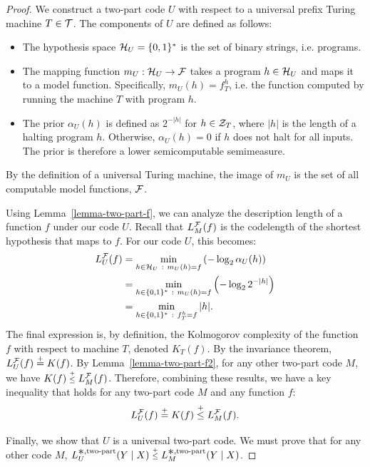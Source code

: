 \begin{proof}
We construct a two-part code $U$ with respect to a universal prefix Turing machine $T \in {\mathcal{T}}$. The components of $U$ are defined as follows:
\begin{itemize}
    \item The hypothesis space ${\mathcal{H}}_U = \{0,1\}^*$ is the set of binary strings, i.e. programs.
    \item The mapping function $m_U: {\mathcal{H}}_U \to {\mathcal{F}}$ takes a program $h \in {\mathcal{H}}_U$ and maps it to a model function. Specifically, $m_U(h) = f_T^h$, i.e. the function computed by running the machine $T$ with program $h$.
    \item The prior $\alpha_U(h)$ is defined as $2^{-|h|}$ for $h \in {\mathcal{Z}}_T$, where $|h|$ is the length of a halting program $h$. Otherwise, $\alpha_U(h) = 0$ if $h$ does not halt for all inputs. The prior is therefore a lower semicomputable semimeasure.
\end{itemize}

By the definition of a universal Turing machine, the image of $m_U$ is the set of all computable model functions, ${\mathcal{F}}$.

Using Lemma~\ref{lemma-two-part-f}, we can analyze the description length of a function $f$ under our code $U$. Recall that $L_M^{\mathcal{F}}(f)$ is the codelength of the shortest hypothesis that maps to $f$. For our code $U$, this becomes:
\begin{align}
    L^{\mathcal{F}}_U(f) &= \min_{h \in {\mathcal{H}}_U  ~:~ m_U(h)=f} \left( -\log_2 \alpha_U(h) \right) \nonumber \\
    &= \min_{h \in \{0,1\}^*  ~:~ m_U(h)=f} \left( -\log_2 2^{-|h|} \right) \nonumber \\
    &= \min_{h \in \{0,1\}^*  ~:~ f^h_T=f} |h|. \label{eq:lfu_is_k}
\end{align}
The final expression is, by definition, the  Kolmogorov complexity of the function $f$ with respect to machine $T$, denoted $K_T(f)$. By the invariance theorem, $L^{\mathcal{F}}_U(f) \stackrel{+}{=} K(f)$. By Lemma~\ref{lemma-two-part-f2}, for any other two-part code $M$, we have $K(f) \leqc L^\gF_M(f)$. Therefore, combining these results, we have a key inequality that holds for any two-part code $M$ and any function $f$:
\begin{equation}
    L_U^\gF(f) \eqc K(f) \leqc L_M^\gF(f). \label{eq:universal_description_length_bound}
\end{equation}

Finally, we show that $U$ is a universal two-part code. We must prove that for any other code $M$, $L^{\bigast,\text{two-part}}_{U}(Y \mid X) \leqc L^{\bigast,\text{two-part}}_{M}(Y \mid X)$.


\end{proof}
